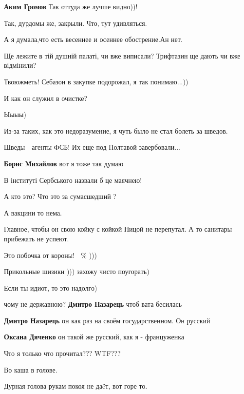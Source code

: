 \begin{itemize}
\textbf{Аким Громов} Так оттуда же лучше видно))!

Так, дурдомы же, закрыли. Что, тут удивляться.

А я думала,что есть весеннее и осеннее обострение.Ан нет.

Ще лежите в тій душній палаті, чи вже виписали? Трифтазин ще дають чи вже відмінили?

Твоюжметь! Себазон в закупке подорожал, я так понимаю...))

И как он служил в очистке?

Ыыыы)

Из-за таких, как это недоразумение, я чуть было не стал болеть за шведов.

Шведы - агенты ФСБ! Их еще под Полтавой завербовали...

\textbf{Борис Михайлов} вот я тоже так думаю

В інституті Сербського назвали б це маячнею!

А кто это? Что это за сумасшедший ?

А вакцини то нема.

Главное, чтобы он свою койку с койкой Ницой не перепутал. А то санитары прибежать не успеют.

Это побочка от короны! 💯 \% )))

Прикольные шизики ))) захожу чисто поугорать)

Если ты идиот, то это надолго)

чому не державною?
\textbf{Дмитро Назарець} чтоб вата бесилась

\textbf{Дмитро Назарець} он как раз на своём государственном. Он русский

\textbf{Оксана Дяченко} он такой же русский, как я - француженка

Что я только что прочитал??? WTF???

Во каша в голове.

Дурная голова рукам покоя не даëт, вот горе то.


\end{itemize}
